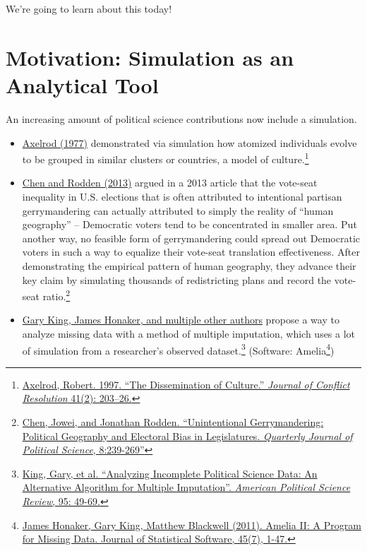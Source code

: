 \documentclass[]{book}
\providecommand{\tightlist}{%
  \setlength{\itemsep}{0pt}\setlength{\parskip}{0pt}}
\let\rmarkdownfootnote\footnote%
\def\footnote{\protect\rmarkdownfootnote}
\theoremstyle{definition}
\theoremstyle{definition}
\theoremstyle{definition}
\theoremstyle{remark}
\begin{document}
We're going to learn about this today!

\hypertarget{motivation-simulation-as-an-analytical-tool}{%
\section{Motivation: Simulation as an Analytical Tool}\label{motivation-simulation-as-an-analytical-tool}}

An increasing amount of political science contributions now include a simulation.

\begin{itemize}
\tightlist
\item
  \href{http://www-personal.umich.edu/~axe/research/Dissemination.pdf}{Axelrod (1977)} demonstrated via simulation how atomized individuals evolve to be grouped in similar clusters or countries, a model of culture.\footnote{\href{http://www-personal.umich.edu/~axe/research/Dissemination.pdf}{Axelrod, Robert. 1997. ``The Dissemination of Culture.'' \emph{Journal of Conflict Resolution} 41(2): 203--26.}}
\item
  \href{http://www-personal.umich.edu/~jowei/florida.pdf}{Chen and Rodden (2013)} argued in a 2013 article that the vote-seat inequality in U.S. elections that is often attributed to intentional partisan gerrymandering can actually attributed to simply the reality of ``human geography'' -- Democratic voters tend to be concentrated in smaller area. Put another way, no feasible form of gerrymandering could spread out Democratic voters in such a way to equalize their vote-seat translation effectiveness. After demonstrating the empirical pattern of human geography, they advance their key claim by simulating thousands of redistricting plans and record the vote-seat ratio.\footnote{\href{http://www-personal.umich.edu/~jowei/florida.pdf}{Chen, Jowei, and Jonathan Rodden. ``Unintentional Gerrymandering: Political Geography and Electoral Bias in Legislatures. \emph{Quarterly Journal of Political Science}, 8:239-269''}}
\item
  \href{https://gking.harvard.edu/files/abs/evil-abs.shtml}{Gary King, James Honaker, and multiple other authors} propose a way to analyze missing data with a method of multiple imputation, which uses a lot of simulation from a researcher's observed dataset.\footnote{\href{https://gking.harvard.edu/files/abs/evil-abs.shtml}{King, Gary, et al. ``Analyzing Incomplete Political Science Data: An Alternative Algorithm for Multiple Imputation''. \emph{American Political Science Review}, 95: 49-69.}} (Software: Amelia\footnote{\href{http://www.jstatsoft.org/v45/i07/}{James Honaker, Gary King, Matthew Blackwell (2011). Amelia II: A Program for Missing Data. Journal of
    Statistical Software, 45(7), 1-47.}})
\end{itemize}
\end{document}
